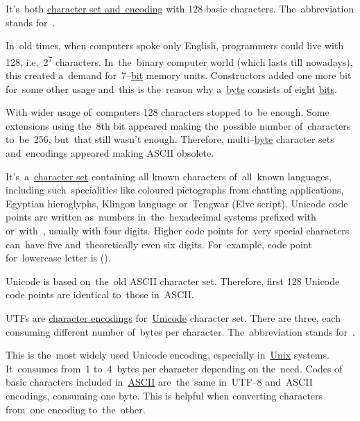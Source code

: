 \label{ascii}
It's~both \hyperref[charactersetencoding]{character set and~encoding} with 128 basic characters.
The~abbreviation stands for~.

In~old times, when computers spoke only English, programmers could live with 128, i.e,~2\textsuperscript{7} characters.
In~the~binary computer world (which lasts till nowadays), this created a~demand for~7--\hyperref[bitsandbytes]{bit} memory units.
Constructors added one more bit for~some other usage and~this is the~reason why a~\hyperref[bitsandbytes]{byte} consists of eight \hyperref[bitsandbytes]{bits}.

With wider usage of~computers 128 characters stopped to~be enough.
Some extensions using the~8th bit appeared making the~possible number of~characters to~be~256, but~that still wasn't enough.
Therefore, multi--\hyperref[bitsandbytes]{byte} character sets and~encodings appeared making ASCII obsolete.

\label{unicode}
It's~a~\hyperref[charactersetencoding]{character set} containing all known characters of~all~known languages, including such~specialities like coloured pictographs from chatting applications, Egyptian hieroglyphs, Klingon language or~Tengwar (Elve script).
Unicode code points are written as~numbers in~the~hexadecimal systems prefixed \mbox{with } \mbox{or with }, usually with four digits.
Higher code points for~very special characters can~have five and~theoretically even six digits.
For~example, code point for~lowercase letter  is  \mbox().

Unicode is based on~the~old ASCII character set.
Therefore, first 128 Unicode code points are identical to~those in~ASCII.

\label{utf}
UTFs are \hyperref[charactersetencoding]{character encodings} for~\hyperref[unicode]{Unicode} character set.
There are three, each consuming different number of~bytes per character.
The~abbreviation stands for~.

\label{utf8}
This is the~most widely used Unicode encoding, especially in~\hyperref[unixlinux]{Unix} systems.
It~consumes from~1 to~4~bytes per character depending on the~need.
Codes of basic characters included in~\hyperref[ascii]{ASCII} are~the~same \mbox{in UTF--8} and~ASCII encodings, consuming one byte.
This is helpful when converting characters from~one encoding to~the~other.

